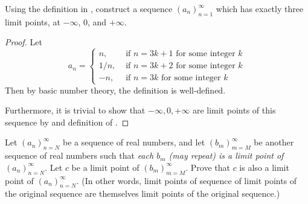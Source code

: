 \begin{exercise} \label{exercise 6.4.9}
Using the definition in , construct a sequence \((a_n)_{n = 1}^{\infty}\) which has exactly three limit points, at \(-\infty\), \(0\), and \(+\infty\).
\end{exercise}

\begin{proof}
Let
\begin{equation} \label{eq 6.1}
    a_n =
    \begin{cases}
      n, & \text{ if } n = 3k + 1 \text{ for some integer } k \\
      1/n, & \text{ if } n = 3k + 2 \text{ for some integer } k \\
      -n, & \text{ if } n = 3k \text{ for some integer } k
    \end{cases}
\end{equation}
Then by basic number theory, the definition is well-defined.

Furthermore, it is trivial to show that \(-\infty, 0, +\infty\) are limit points of this sequence by  and definition of .
\end{proof}

\begin{exercise}
\label{exercise 6.4.10}
Let \((a_n)_{n = N}^{\infty}\) be a sequence of real numbers, and let \((b_m)_{m = M}^{\infty}\) be another sequence of real numbers such that \emph{each \(b_m\) (may repeat) is a limit point of} \((a_n)_{n = N}^{\infty}\).
Let \(c\) be a limit point of \((b_m)_{m = M}^{\infty}\).
Prove that \(c\) is also a limit point of \((a_n)_{n = N}^{\infty}\).
(In other words, limit points of sequence of limit points of the original sequence are themselves limit points of the original sequence.)
\end{exercise}

